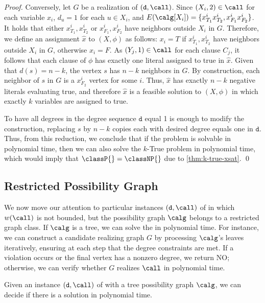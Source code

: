 \begin{proof}
    Conversely, let $G$ be a realization of $(\texttt{d}, \call)$.
    Since $(X_i,2)\in \call$ for each variable $x_i$, $d_u = 1$ for each $u \in X_i$, and $E(\calg[X_i])=\{ x^i_{T_1} x^i_{T_2}, x^i_{F_1} x^i_{F_2}\}$. It holds that either $x^i_{T_1}, x^i_{T_2}$ or $x^i_{F_1},x^i_{F_2}$ have neighbors outside $X_i$ in $G$. Therefore, we define an assignment $\hat{x}$ to $(X,\phi)$ as follows: $x_i=T$ if $x^i_{T_1}, x^i_{T_2}$ have neighbors outside $X_i$ in $G$, otherwise $x_i=F$. As $(Y_j, 1)\in \call$ for each clause $C_j$, it follows that each clause of $\phi$ has exactly one literal assigned to true in $\hat{x}$. Given that $d(s)=n-k$, the vertex $s$ has $n-k$ neighbors in $G$. By construction, each neighbor of $s$ in $G$ is a $x^i_{F_2}$ vertex for some $i$. Thus, $\hat{x}$ has exactly $n-k$ negative literals evaluating true, and therefore $\hat{x}$ is a feasible solution to $(X, \phi)$ in which exactly $k$ variables are assigned to true.
    
    To have all degrees in the degree sequence $\texttt{d}$ equal 1 is enough to modify the construction, replacing $s$ by $n-k$ copies each with desired degree equals one in $\texttt{d}$.  
    Thus, from this reduction, we conclude that if the \GRC{} problem is solvable in polynomial time, then we can also solve the $k$-True \rXthreeSAT{} problem in polynomial time, which would imply that $\classP{} = \classNP{}$ due to \cref{thm:k-true-xsat}. \qed
\end{proof}


\subsection{Restricted Possibility Graph}

We now move our attention to particular instances $(\texttt{d}, \call)$ of \GRC{} in which $w(\call)$ is not bounded, but the possibility graph $\calg$ belongs to a restricted graph class.
%
If $\calg$ is a tree, we can solve the \GRC{} in polynomial time.
%
For instance, we can construct a candidate realizing graph $G$ by processing $\calg$'s leaves iteratively, ensuring at each step that the degree constraints are met. If a violation occurs or the final vertex has a nonzero degree, we return NO; otherwise, we can verify whether $G$ realizes $\call$ in polynomial time.

\begin{proposition}
    \label{prep:tree_graph}
    Given an instance $(\texttt{d}, \call)$ of \GRC{} with a tree possibility graph $\calg$, we can decide if there is a solution in polynomial time.
\end{proposition}

